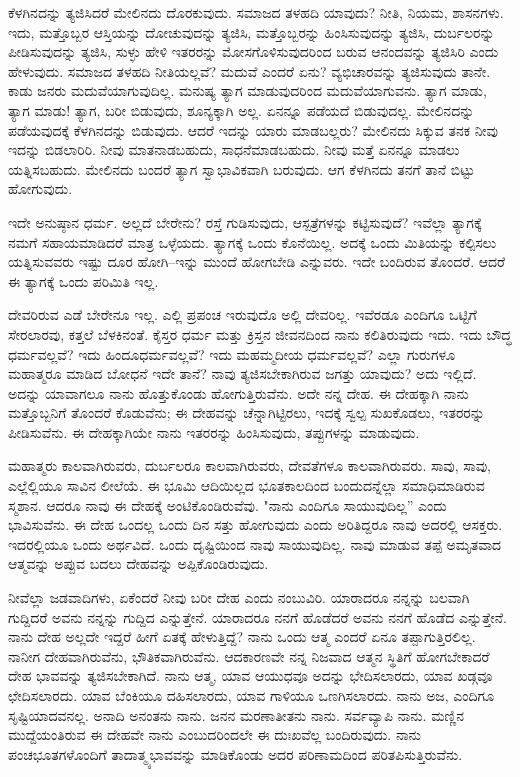 ಕೆಳಗಿನದನ್ನು ತ್ಯಜಿಸಿದರೆ ಮೇಲಿನದು ದೊರಕುವುದು. ಸಮಾಜದ ತಳಹದಿ ಯಾವುದು? ನೀತಿ, ನಿಯಮ, ಶಾಸನಗಳು. ಇದು, ಮತ್ತೊಬ್ಬರ ಆಸ್ತಿಯನ್ನು ದೋಚುವುದನ್ನು ತ್ಯಜಿಸಿ, ಮತ್ತೊಬ್ಬರನ್ನು ಹಿಂಸಿಸುವುದನ್ನು ತ್ಯಜಿಸಿ, ದುರ್ಬಲರನ್ನು ಪೀಡಿಸುವುದನ್ನು ತ್ಯಜಿಸಿ, ಸುಳ್ಳು ಹೇಳಿ ಇತರರನ್ನು ಮೋಸಗೊಳಿಸುವುದರಿಂದ ಬರುವ ಆನಂದವನ್ನು ತ್ಯಜಿಸಿರಿ ಎಂದು ಹೇಳುವುದು. ಸಮಾಜದ ತಳಹದಿ ನೀತಿಯಲ್ಲವೆ? ಮದುವೆ ಎಂದರೆ ಏನು? ವ್ಯಭಿಚಾರವನ್ನು ತ್ಯಜಿಸುವುದು ತಾನೇ. ಕಾಡು ಜನರು ಮದುವೆಯಾಗುವುದಿಲ್ಲ. ಮನುಷ್ಯ ತ್ಯಾಗ ಮಾಡುವುದರಿಂದ ಮದುವೆಯಾಗುವನು. ತ್ಯಾಗ ಮಾಡು, ತ್ಯಾಗ ಮಾಡು! ತ್ಯಾಗ, ಬರೀ ಬಿಡುವುದು, ಶೂನ್ಯಕ್ಕಾಗಿ ಅಲ್ಲ. ಏನನ್ನೂ ಪಡೆಯದೆ ಬಿಡುವುದಲ್ಲ. ಮೇಲಿನದನ್ನು ಪಡೆಯವುದಕ್ಕೆ ಕೆಳಗಿನದನ್ನು ಬಿಡುವುದು. ಆದರೆ ಇದನ್ನು ಯಾರು ಮಾಡಬಲ್ಲರು? ಮೇಲಿನದು ಸಿಕ್ಕುವ ತನಕ ನೀವು ಇದನ್ನು ಬಿಡಲಾರಿರಿ. ನೀವು ಮಾತನಾಡಬಹುದು, ಸಾಧನೆಮಾಡಬಹುದು. ನೀವು ಮತ್ತೆ ಏನನ್ನೂ ಮಾಡಲು ಯತ್ನಿಸಬಹುದು. ಮೇಲಿನದು ಬಂದರೆ ತ್ಯಾಗ ಸ್ವಾಭಾವಿಕವಾಗಿ ಬರುವುದು. ಆಗ ಕೆಳಗಿನದು ತನಗೆ ತಾನೆ ಬಿಟ್ಟು ಹೋಗುವುದು.

ಇದೇ ಅನುಷ್ಠಾನ ಧರ್ಮ. ಅಲ್ಲದೆ ಬೇರೇನು? ರಸ್ತೆ ಗುಡಿಸುವುದು, ಆಸ್ಪತ್ರೆಗಳನ್ನು ಕಟ್ಟಿಸುವುದೆ? ಇವೆಲ್ಲಾ ತ್ಯಾಗಕ್ಕೆ ನಮಗೆ ಸಹಾಯಮಾಡಿದರೆ ಮಾತ್ರ ಒಳ್ಳೆಯದು. ತ್ಯಾಗಕ್ಕೆ ಒಂದು ಕೊನೆಯಿಲ್ಲ. ಅದಕ್ಕೆ ಒಂದು ಮಿತಿಯನ್ನು ಕಲ್ಪಿಸಲು ಯತ್ನಿಸುವವರು ಇಷ್ಟು ದೂರ ಹೋಗಿ–ಇನ್ನು ಮುಂದೆ ಹೋಗಬೇಡಿ ಎನ್ನುವರು. ಇದೇ ಬಂದಿರುವ ತೊಂದರೆ. ಆದರೆ ಈ ತ್ಯಾಗಕ್ಕೆ ಒಂದು ಪರಿಮಿತಿ ಇಲ್ಲ.

ದೇವರಿರುವ ಎಡೆ ಬೇರೇನೂ ಇಲ್ಲ. ಎಲ್ಲಿ ಪ್ರಪಂಚ ಇರುವುದೊ ಅಲ್ಲಿ ದೇವರಿಲ್ಲ. ಇವೆರಡೂ ಎಂದಿಗೂ ಒಟ್ಟಿಗೆ ಸೇರಲಾರವು, ಕತ್ತಲೆ ಬೆಳಕಿನಂತೆ. ಕೈಸ್ತರ ಧರ್ಮ ಮತ್ತು ಕ್ರಿಸ್ತನ ಜೀವನದಿಂದ ನಾನು ಕಲಿತಿರುವುದು ಇದು. ಇದು ಬೌದ್ಧ ಧರ್ಮವಲ್ಲವೆ? ಇದು ಹಿಂದೂಧರ್ಮವಲ್ಲವೆ? ಇದು ಮಹಮ್ಮದೀಯ ಧರ್ಮವಲ್ಲವೆ? ಎಲ್ಲಾ ಗುರುಗಳೂ ಮಹಾತ್ಮರೂ ಮಾಡಿದ ಬೋಧನೆ ಇದೇ ತಾನೆ? ನಾವು ತ್ಯಜಿಸಬೇಕಾಗಿರುವ ಜಗತ್ತು ಯಾವುದು? ಅದು ಇಲ್ಲಿದೆ. ಅದನ್ನು ಯಾವಾಗಲೂ ನಾನು ಹೊತ್ತುಕೊಂಡು ಹೋಗುತ್ತಿರುವೆನು. ಅದೇ ನನ್ನ ದೇಹ. ಈ ದೇಹಕ್ಕಾಗಿ ನಾನು ಮತ್ತೊಬ್ಬನಿಗೆ ತೊಂದರೆ ಕೊಡುವೆನು; ಈ ದೇಹವನ್ನು ಚೆನ್ನಾಗಿಟ್ಟಿರಲು, ಇದಕ್ಕೆ ಸ್ವಲ್ಪ ಸುಖಕೊಡಲು, ಇತರರನ್ನು ಪೀಡಿಸುವೆನು. ಈ ದೇಹಕ್ಕಾಗಿಯೇ ನಾನು ಇತರರನ್ನು ಹಿಂಸಿಸುವುದು, ತಪ್ಪುಗಳನ್ನು ಮಾಡುವುದು.

ಮಹಾತ್ಮರು ಕಾಲವಾಗಿರುವರು, ದುರ್ಬಲರೂ ಕಾಲವಾಗಿರುವರು, ದೇವತೆಗಳೂ ಕಾಲವಾಗಿರುವರು. ಸಾವು, ಸಾವು, ಎಲ್ಲೆಲ್ಲಿಯೂ ಸಾವಿನ ಲೀಲೆಯೆ. ಈ ಭೂಮಿ ಆದಿಯಿಲ್ಲದ ಭೂತಕಾಲದಿಂದ ಬಂದುದನ್ನೆಲ್ಲಾ ಸಮಾಧಿಮಾಡಿರುವ ಸ್ಮಶಾನ. ಆದರೂ ನಾವು ಈ ದೇಹಕ್ಕೆ ಅಂಟಿಕೊಂಡಿರುವೆವು. "ನಾನು ಎಂದಿಗೂ ಸಾಯುವುದಿಲ್ಲ” ಎಂದು ಭಾವಿಸುವೆನು. ಈ ದೇಹ ಒಂದಲ್ಲ ಒಂದು ದಿನ ಸತ್ತು ಹೋಗುವುದು ಎಂದು ಅರಿತಿದ್ದರೂ ನಾವು ಅದರಲ್ಲಿ ಆಸಕ್ತರು. ಇದರಲ್ಲಿಯೂ ಒಂದು ಅರ್ಥವಿದೆ. ಒಂದು ದೃಷ್ಟಿಯಿಂದ ನಾವು ಸಾಯುವುದಿಲ್ಲ. ನಾವು ಮಾಡುವ ತಪ್ಪೆ ಅಮೃತವಾದ ಆತ್ಮವನ್ನು ಅಪ್ಪುವ ಬದಲು ದೇಹವನ್ನು ಅಪ್ಪಿಕೊಂಡಿರುವುದು.

ನೀವೆಲ್ಲಾ ಜಡವಾದಿಗಳು, ಏಕೆಂದರೆ ನೀವು ಬರೀ ದೇಹ ಎಂದು ನಂಬುವಿರಿ. ಯಾರಾದರೂ ನನ್ನನ್ನು ಬಲವಾಗಿ ಗುದ್ದಿದರೆ ಅವನು ನನ್ನನ್ನು ಗುದ್ದಿದ ಎನ್ನುತ್ತೇನೆ. ಯಾರಾದರೂ ನನಗೆ ಹೊಡೆದರೆ ಅವನು ನನಗೆ ಹೊಡೆದ ಎನ್ನುತ್ತೇನೆ. ನಾನು ದೇಹ ಅಲ್ಲದೇ ಇದ್ದರೆ ಹೀಗೆ ಏತಕ್ಕೆ ಹೇಳುತ್ತಿದ್ದೆ? ನಾನು ಒಂದು ಆತ್ಮ ಎಂದರೆ ಏನೂ ತಪ್ಪಾಗುತ್ತಿರಲಿಲ್ಲ. ನಾನೀಗ ದೇಹವಾಗಿರುವೆನು, ಭೌತಿಕವಾಗಿರುವೆನು. ಆದಕಾರಣವೇ ನನ್ನ ನಿಜವಾದ ಆತ್ಮನ ಸ್ಥಿತಿಗೆ ಹೋಗಬೇಕಾದರೆ ದೇಹ ಭಾವವನ್ನು ತ್ಯಜಿಸಬೇಕಾಗಿದೆ. ನಾನು ಆತ್ಮ, ಯಾವ ಆಯುಧವೂ ಅದನ್ನು ಭೇದಿಸಲಾರದು, ಯಾವ ಖಡ್ಗವೂ ಛೇದಿಸಲಾರದು. ಯಾವ ಬೆಂಕಿಯೂ ದಹಿಸಲಾರದು, ಯಾವ ಗಾಳಿಯೂ ಒಣಗಿಸಲಾರದು. ನಾನು ಅಜ, ಎಂದಿಗೂ ಸೃಷ್ಟಿಯಾದವನಲ್ಲ. ಅನಾದಿ ಅನಂತನು ನಾನು. ಜನನ ಮರಣಾತೀತನು ನಾನು. ಸರ್ವವ್ಯಾಪಿ ನಾನು. ಮಣ್ಣಿನ ಮುದ್ದೆಯಂತಿರುವ ಈ ದೇಹವೇ ನಾನು ಎಂಬುದರಿಂದಲೇ ಈ ದುಃಖವೆಲ್ಲ ಬಂದಿರುವುದು. ನಾನು ಪಂಚಭೂತಗಳೊಂದಿಗೆ ತಾದಾತ್ಮ್ಯಭಾವವನ್ನು ಮಾಡಿಕೊಂಡು ಅದರ ಪರಿಣಾಮದಿಂದ ಪರಿತಪಿಸುತ್ತಿರುವೆನು.

